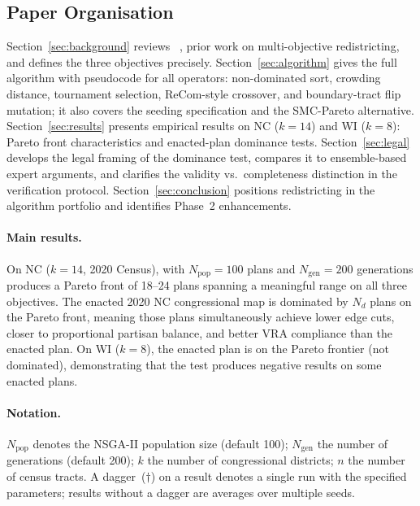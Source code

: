 \subsection{Paper Organisation}

Section~\ref{sec:background} reviews \nsga{}~\citep{deb2002}, prior work on
multi-objective redistricting, and defines the three objectives precisely.
Section~\ref{sec:algorithm} gives the full \nsga{} algorithm with pseudocode
for all operators: non-dominated sort, crowding distance, tournament selection,
ReCom-style crossover, and boundary-tract flip mutation; it also covers the
seeding specification and the SMC-Pareto alternative.
Section~\ref{sec:results} presents empirical results on NC ($k=14$) and
WI ($k=8$): Pareto front characteristics and enacted-plan dominance tests.
Section~\ref{sec:legal} develops the legal framing of the dominance test,
compares it to ensemble-based expert arguments, and clarifies the validity
vs.\ completeness distinction in the verification protocol.
Section~\ref{sec:conclusion} positions \nsga{} redistricting in the algorithm
portfolio and identifies Phase~2 enhancements.

\paragraph{Main results.}
On NC ($k=14$, 2020 Census), \nsga{} with $N_{\mathrm{pop}}=100$ plans and
$N_{\mathrm{gen}}=200$ generations produces a Pareto front of 18--24 plans
spanning a meaningful range on all three objectives.
The enacted 2020 NC congressional map is dominated by \ensuremath{N_d} plans
on the Pareto front, meaning those plans simultaneously achieve lower edge cuts,
closer to proportional partisan balance, and better VRA compliance than the
enacted plan.
On WI ($k=8$), the enacted plan is on the Pareto frontier (not dominated),
demonstrating that the test produces negative results on some enacted plans.

\paragraph{Notation.}
$N_{\mathrm{pop}}$ denotes the NSGA-II population size (default 100);
$N_{\mathrm{gen}}$ the number of generations (default 200);
$k$ the number of congressional districts;
$n$ the number of census tracts.
A dagger~($\dagger$) on a result denotes a single run with the specified
parameters; results without a dagger are averages over multiple seeds.
